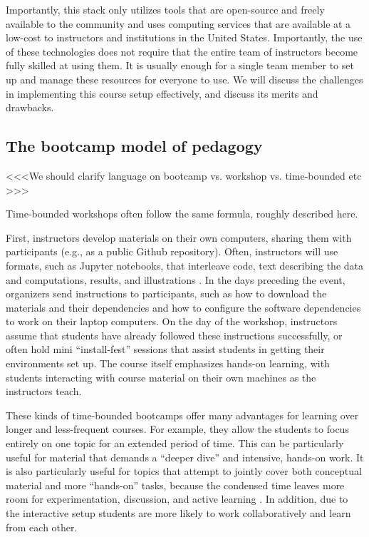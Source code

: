 Importantly, this stack only utilizes tools that are
open-source and freely available to
the community and uses computing services that are available at a low-cost
to instructors and institutions in the United States. Importantly, the
use of these technologies does not require that the entire
team of instructors become fully skilled at using them. It is
usually enough for a single team member to set up and manage these resources
for everyone to use. We will discuss the challenges in
implementing this course setup effectively,
and discuss its merits and drawbacks.

\subsection{The bootcamp model of pedagogy}

<<<We should clarify language on bootcamp vs. workshop vs. time-bounded etc >>>

Time-bounded workshops often follow the same formula, roughly described here.

First, instructors develop materials on their own computers, sharing them with
participants (e.g., as a public Github repository). Often, instructors will use
formats, such as Jupyter notebooks, that interleave code, text describing the
data and computations, results, and illustrations
\cite{kluyver2016jupyter}. In the days preceding the event, organizers send
instructions to participants, such as how to download the materials and their
dependencies and how to configure the software dependencies to work on their
laptop computers. On the day of the workshop, instructors assume that
students have already followed these instructions successfully, or often hold
mini ``install-fest'' sessions that assist students in
getting their environments set up. The course itself emphasizes hands-on
learning, with students interacting with course material on their own
machines as the instructors teach.

These kinds of time-bounded bootcamps offer many advantages for learning over
longer and less-frequent courses. For example, they allow the students to focus
entirely on one topic for an extended period of time. This can be particularly
useful for material that demands a ``deeper dive'' and intensive, hands-on
work. It is also particularly useful for topics that attempt to jointly
cover both conceptual material and more ``hands-on'' tasks, because the
condensed time leaves more room for experimentation, discussion, and active
learning \citep{Bransford2000-lu, Papert1980-fh}. In addition, due to the
interactive setup students are more likely to work collaboratively and learn
from each other.

